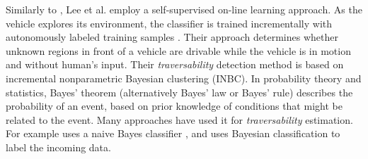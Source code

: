\documentclass[12pt,a4paper]{report}
\newcommand{\etal}[1]{#1 et al.}
\newcommand{\term}{\textit}
\newcommand{\acronym}{\MakeUppercase}
\begin{document}
	Similarly to \cite{Kim}, \etal{Lee} employ a self-supervised on-line learning 
	approach. As the vehicle explores its environment, the classifier is trained 
	incrementally with autonomously labeled training samples \cite{Lee}. Their 
	approach determines whether unknown regions in front of a vehicle are drivable 
	while the vehicle is in motion and without human’s input. Their 
	\term{traversability} detection method is based on incremental nonparametric 
	Bayesian clustering (\acronym{inbc}). In probability theory and statistics, 
	Bayes' theorem (alternatively Bayes' law or Bayes' rule) describes the 
	probability of an event, based on prior knowledge of conditions that might be 
	related to the event. Many approaches have used it for \term{traversability} 
	estimation. For example \cite{Suger} uses a naive Bayes classifier \cite{Denis}, 
	and \cite{Lalonde} uses Bayesian classification to label the incoming data.
	\\
	
\end{document}
